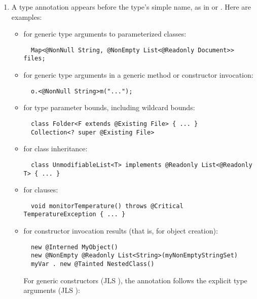 \documentclass[10pt]{article}
\begin{document}
\begin{enumerate}
\item
  A type annotation appears before the type's simple name, as in 
  or .
%
  Here are examples:
\begin{itemize}
\item for generic type arguments to parameterized classes:
\preverbnegspace
\begin{Verbatim}
  Map<@NonNull String, @NonEmpty List<@Readonly Document>> files;
\end{Verbatim}

\item for generic type arguments in a generic method or constructor invocation:
\preverbnegspace
\begin{Verbatim}
  o.<@NonNull String>m("...");
\end{Verbatim}

\item for type parameter bounds, including wildcard bounds:
\preverbnegspace
\begin{Verbatim}
  class Folder<F extends @Existing File> { ... }
  Collection<? super @Existing File>
\end{Verbatim}

\item for class inheritance:
\preverbnegspace
\begin{Verbatim}
  class UnmodifiableList<T> implements @Readonly List<@Readonly T> { ... }
\end{Verbatim}

\item for  clauses:
\preverbnegspace
\begin{Verbatim}
  void monitorTemperature() throws @Critical TemperatureException { ... }
\end{Verbatim}

\item for constructor invocation results (that is, for object creation):

\preverbnegspace
\begin{Verbatim}
  new @Interned MyObject()
  new @NonEmpty @Readonly List<String>(myNonEmptyStringSet)
  myVar . new @Tainted NestedClass()
\end{Verbatim}
\preverbnegspace

For generic constructors (JLS ), the
annotation follows the explicit type arguments (JLS
):


\end{itemize}
\end{enumerate}
\end{document}
